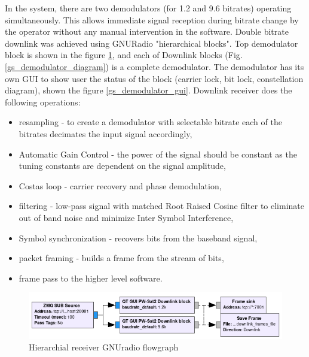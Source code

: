 In the system, there are two demodulators (for \SI{1.2}{\kbps} and \SI{9.6}{\kbps} bitrates) operating simultaneously. This allows immediate signal reception during bitrate change by the operator without any manual intervention in the software. Double bitrate downlink was achieved using GNURadio "hierarchical blocks". Top demodulator block is shown in the figure \ref{gs_demodulator_hier}, and each of Downlink blocks (Fig. \ref{gs_demodulator_diagram}) is a complete demodulator. The demodulator has its own GUI to show user the status of the block (carrier lock, bit lock, constellation diagram), shown the figure \ref{gs_demodulator_gui}.
Downlink receiver does the following operations:
\begin{itemize}
    \item resampling - to create a demodulator with selectable bitrate each of the bitrates decimates the input signal accordingly,
    \item Automatic Gain Control - the power of the signal should be constant as the tuning constants are dependent on the signal amplitude,
    \item Costas loop - carrier recovery and phase demodulation,
    \item filtering - low-pass signal with matched Root Raised Cosine filter to eliminate out of band noise and minimize Inter Symbol Interference,
    \item Symbol synchronization - recovers bits from the baseband signal,
    \item packet framing - builds a frame from the stream of bits,
    \item frame pass to the higher level software.
\end{itemize}

\begin{figure}[H]
    \centering
    \includegraphics[width=0.7\paperwidth]{img/7/gs_downlink_hier.png}
    \caption{Hierarchial receiver GNUradio flowgraph}
    \label{gs_demodulator_hier}
\end{figure}

